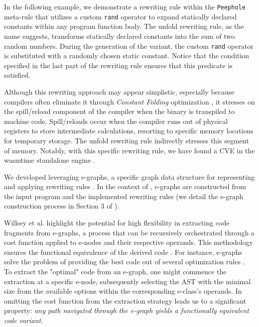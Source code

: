 In the following example, we demonstrate a rewriting rule within the \texttt{Peephole} meta-rule that utilizes a custom \texttt{rand} operator to expand statically declared constants within any \Wasm program function body. 
The unfold rewriting rule, as the name suggests, transforms statically declared constants into the sum of two random numbers.
During the generation of the \Wasm variant, the custom \texttt{rand} operator is substituted with a randomly chosen static constant.
Notice that the condition specified in the last part of the rewriting rule ensures that this predicate is satisfied. 




Although this rewriting approach may appear simplistic, especially because compilers often eliminate it through \emph{Constant Folding} optimization \cite{constant_folding}, it stresses on the spill/reload component of the compiler when the \Wasm binary is transpiled to machine code.
Spill/reloads occur when the compiler runs out of physical registers to store intermediate calculations, resorting to specific memory locations for temporary storage. 
The unfold rewriting rule indirectly stresses this segment of memory. 
Notably, with this specific rewriting rule, we have found a CVE in the wasmtime standalone engine \cite{CVE}.




We developed \tool leveraging e-graphs, a specific graph data structure for representing and applying rewriting rules \cite{10.1145/3571207}. 
In the context of \tool, e-graphs are constructed from the input \Wasm program and the implemented rewriting rules (we detail the e-graph construction process in Section 3 of \cite{wasmmutate}).

Willsey et al. highlight the potential for high flexibility in extracting code fragments from e-graphs, a process that can be recursively orchestrated through a cost function applied to e-nodes and their respective operands.
This methodology ensures the functional equivalence of the derived code \cite{e-graph}. 
For instance, e-graphs solve the problem of providing the best code out of several optimization rules \cite{10.1145/1480881.1480915}.
To extract the "optimal" code from an e-graph, one might commence the extraction at a specific e-node, subsequently selecting the AST with the minimal size from the available options within the corresponding e-class's operands.
In \too omitting the cost function from the extraction strategy leads us to a significant property: \emph{any path navigated through the e-graph yields a functionally equivalent code variant}. 

